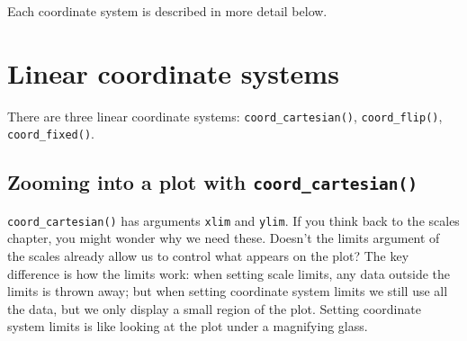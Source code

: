 Each coordinate system is described in more detail below.

\section{Linear coordinate systems}\label{sub:cartesian}

There are three linear coordinate systems: \texttt{coord\_cartesian()},
\texttt{coord\_flip()}, \texttt{coord\_fixed()}.
 

\subsection{\texorpdfstring{Zooming into a plot with
\texttt{coord\_cartesian()}}{Zooming into a plot with coord\_cartesian()}}

\texttt{coord\_cartesian()} has arguments \texttt{xlim} and
\texttt{ylim}. If you think back to the scales chapter, you might wonder
why we need these. Doesn't the limits argument of the scales already
allow us to control what appears on the plot? The key difference is how
the limits work: when setting scale limits, any data outside the limits
is thrown away; but when setting coordinate system limits we still use
all the data, but we only display a small region of the plot. Setting
coordinate system limits is like looking at the plot under a magnifying
glass. 

\begin{Shaded}
\begin{Highlighting}[]
\StringTok{ }\StringTok{ }
\StringTok{  }\NormalTok{() +}\StringTok{ }
\StringTok{  }\NormalTok{()}

\StringTok{ }\NormalTok{(} \NormalTok{(}\NormalTok{, }\NormalTok{))}
\StringTok{ }\NormalTok{(} \NormalTok{(}\NormalTok{, }\NormalTok{))}
\end{Highlighting}
\end{Shaded}

